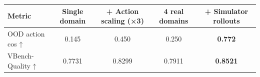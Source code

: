 \documentclass[border=4pt]{standalone}
\begin{document}
\setlength{\tabcolsep}{9pt}
\renewcommand{\arraystretch}{1.12}
\begin{tabular}{lcccc}
\toprule
Metric & Single domain & + Action scaling (×3) & 4 real domains & \cellcolor{prismpale}\textbf{+ Simulator rollouts} \\
\midrule
OOD action cos ↑ & 0.145  & 0.450  & 0.250  & \cellcolor{prismpale}\textbf{0.772} \\
VBench-Quality ↑ & 0.7731 & 0.8299 & 0.7911 & \cellcolor{prismpale}\textbf{0.8521} \\
\bottomrule
\end{tabular}
\end{document}
